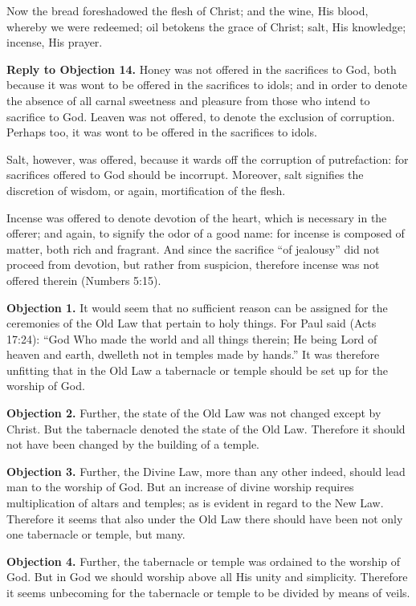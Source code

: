 Now the bread foreshadowed the flesh of Christ; and the wine, His blood, whereby we were redeemed; oil betokens the grace of Christ; salt, His knowledge; incense, His prayer.

\textbf{Reply to Objection 14.} Honey was not offered in the sacrifices to God, both because it was wont to be offered in the sacrifices to idols; and in order to denote the absence of all carnal sweetness and pleasure from those who intend to sacrifice to God. Leaven was not offered, to denote the exclusion of corruption. Perhaps too, it was wont to be offered in the sacrifices to idols.

Salt, however, was offered, because it wards off the corruption of putrefaction: for sacrifices offered to God should be incorrupt. Moreover, salt signifies the discretion of wisdom, or again, mortification of the flesh.

Incense was offered to denote devotion of the heart, which is necessary in the offerer; and again, to signify the odor of a good name: for incense is composed of matter, both rich and fragrant. And since the sacrifice ``of jealousy'' did not proceed from devotion, but rather from suspicion, therefore incense was not offered therein (Numbers 5:15).


\textbf{Objection 1.} It would seem that no sufficient reason can be assigned for the ceremonies of the Old Law that pertain to holy things. For Paul said (Acts 17:24): ``God Who made the world and all things therein; He being Lord of heaven and earth, dwelleth not in temples made by hands.'' It was therefore unfitting that in the Old Law a tabernacle or temple should be set up for the worship of God.

\textbf{Objection 2.} Further, the state of the Old Law was not changed except by Christ. But the tabernacle denoted the state of the Old Law. Therefore it should not have been changed by the building of a temple.

\textbf{Objection 3.} Further, the Divine Law, more than any other indeed, should lead man to the worship of God. But an increase of divine worship requires multiplication of altars and temples; as is evident in regard to the New Law. Therefore it seems that also under the Old Law there should have been not only one tabernacle or temple, but many.

\textbf{Objection 4.} Further, the tabernacle or temple was ordained to the worship of God. But in God we should worship above all His unity and simplicity. Therefore it seems unbecoming for the tabernacle or temple to be divided by means of veils.

